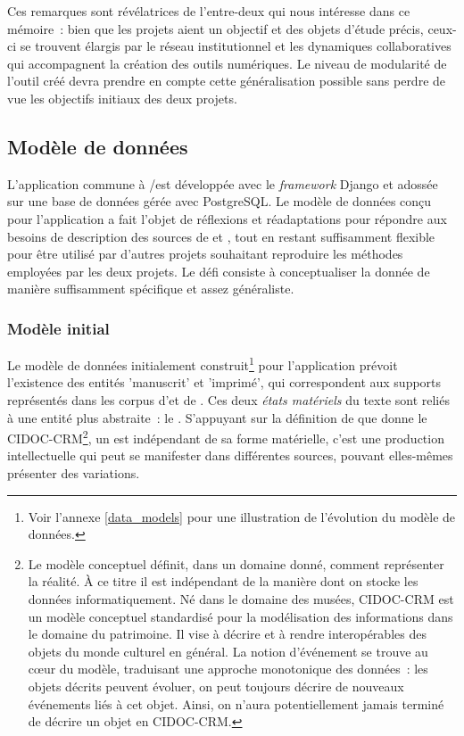 Ces remarques sont révélatrices de l'entre-deux qui nous intéresse dans
ce mémoire~: bien que les projets aient un objectif et des objets
d'étude précis, ceux-ci se trouvent élargis par le réseau institutionnel
et les dynamiques collaboratives qui accompagnent la création des outils
numériques. Le niveau de modularité de l'outil créé devra prendre en
compte cette généralisation possible sans perdre de vue les objectifs
initiaux des deux projets.

\hypertarget{modele-de-donnees}{%
\subsection{Modèle de données}\label{modele-de-donnees}}

L'application commune à \vhs/\eida est développée avec le \textit{framework} Django
et adossée sur une base de données gérée avec PostgreSQL. Le modèle de
données conçu pour l'application a fait l'objet de réflexions et
réadaptations pour répondre aux besoins de description des sources de
\vhs et \eida, tout en restant suffisamment flexible pour être utilisé par
d'autres projets souhaitant reproduire les méthodes employées par les
deux projets. Le défi consiste à conceptualiser la donnée de manière
suffisamment spécifique et assez généraliste.

\hypertarget{modele-initial}{%
\subsubsection{Modèle initial}\label{modele-initial}}

Le modèle de données initialement construit\footnote{Voir l'annexe \ref{data_models} pour une illustration de l'évolution du modèle de données.} pour
l'application \vhs prévoit l'existence des entités 'manuscrit' et
'imprimé', qui correspondent aux supports représentés dans
les corpus d'\eida et de \vhs. Ces deux \emph{états matériels} du texte
sont reliés à une entité plus abstraite~: le \wo.
S'appuyant sur la définition de \wo que donne le CIDOC-CRM\footnote{Le
  modèle conceptuel définit, dans un domaine donné, comment représenter
  la réalité. À ce titre il est indépendant de la manière dont on stocke
  les données informatiquement. Né dans le domaine des musées, CIDOC-CRM
  est un modèle conceptuel standardisé pour la modélisation des
  informations dans le domaine du patrimoine. Il vise à décrire et à
  rendre interopérables des objets du monde culturel en général. La
  notion d'événement se trouve au cœur du modèle, traduisant une
  approche monotonique des données~: les objets décrits peuvent évoluer,
  on peut toujours décrire de nouveaux événements liés à cet objet.
  Ainsi, on n'aura potentiellement jamais terminé de décrire un objet en
  CIDOC-CRM.}, un \wo est indépendant de sa forme matérielle, c'est une
production intellectuelle qui peut se manifester dans différentes
sources, pouvant elles-mêmes présenter des variations.

